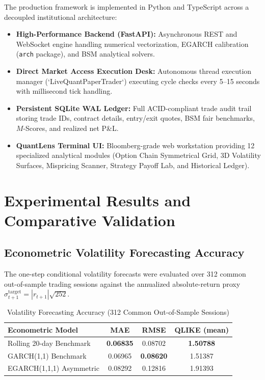 \documentclass[journal]{IEEEtran}
\begin{document}
The production framework is implemented in Python and TypeScript across a decoupled institutional architecture:
\begin{itemize}
    \item \textbf{High-Performance Backend (FastAPI):} Asynchronous REST and WebSocket engine handling numerical vectorization, EGARCH calibration (\texttt{arch} package), and BSM analytical solvers.
    \item \textbf{Direct Market Access Execution Desk:} Autonomous thread execution manager (`LiveQuantPaperTrader`) executing cycle checks every 5--15 seconds with millisecond tick handling.
    \item \textbf{Persistent SQLite WAL Ledger:} Full ACID-compliant trade audit trail storing trade IDs, contract details, entry/exit quotes, BSM fair benchmarks, $M$-Scores, and realized net P\&L.
    \item \textbf{QuantLens Terminal UI:} Bloomberg-grade web workstation providing 12 specialized analytical modules (Option Chain Symmetrical Grid, 3D Volatility Surfaces, Mispricing Scanner, Strategy Payoff Lab, and Historical Ledger).
\end{itemize}

\section{Experimental Results and Comparative Validation}

\subsection{Econometric Volatility Forecasting Accuracy}
The one-step conditional volatility forecasts were evaluated over 312 common out-of-sample trading sessions against the annualized absolute-return proxy $\sigma_{t+1}^{\mathrm{target}} = |r_{t+1}|\sqrt{252}$. 

\begin{table}[!t]
\renewcommand{\arraystretch}{1.2}
\caption{Volatility Forecasting Accuracy (312 Common Out-of-Sample Sessions)}
\label{tab:vol_forecast}
\centering
\begin{tabular}{lccc}
\toprule
\textbf{Econometric Model} & \textbf{MAE} & \textbf{RMSE} & \textbf{QLIKE (mean)} \\
\midrule
Rolling 20-day Benchmark  & \textbf{0.06835} & 0.08702 & \textbf{1.50788} \\
GARCH(1,1) Benchmark      & 0.06965 & \textbf{0.08620} & 1.51387 \\
EGARCH(1,1,1) Asymmetric  & 0.08292 & 0.12816 & 1.91393 \\
\bottomrule
\end{tabular}
\end{table}
\end{document}
